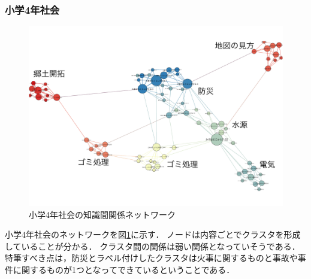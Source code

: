 \subsubsection{小学4年社会}
\begin{figure}[!htb]
\begin{center}
	\includegraphics[width=330pt]{./img/s4_soc_label2.pdf}
	\caption{小学4年社会の知識間関係ネットワーク}
	\label{fig:net_s4soc}
\end{center}
\end{figure}
小学4年社会のネットワークを図\ref{fig:net_s4soc}に示す．
ノードは内容ごとでクラスタを形成していることが分かる．
クラスタ間の関係は弱い関係となっていそうである．
特筆すべき点は，防災とラベル付けしたクラスタは火事に関するものと事故や事件に関するものが1つとなってできているということである．






